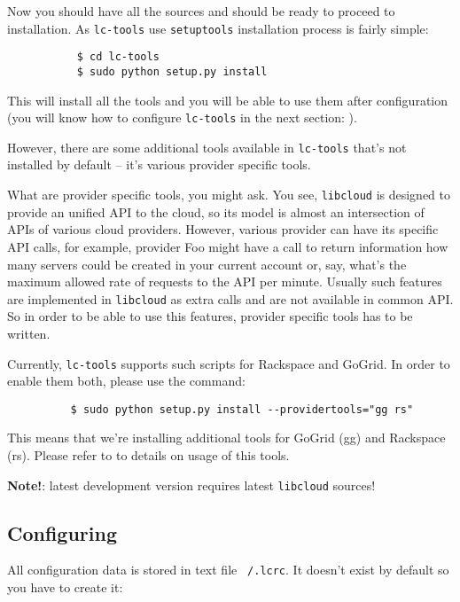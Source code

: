 \documentclass[a4paper]{report}
\begin{document}
          Now you should have all the sources and should be ready to proceed to
          installation. As {\tt lc-tools} use {\tt setuptools} installation
          process is fairly simple:

          \begin{verbatim}
           $ cd lc-tools
           $ sudo python setup.py install
           \end{verbatim}

         This will install all the tools and you will be able to use them
         after configuration (you will know how to configure {\tt lc-tools}
         in the next section: ).

         However, there are some additional tools available in {\tt lc-tools}
         that's not installed by default -- it's various provider specific tools.

         What are provider specific tools, you might ask. You see, {\tt libcloud}
         is designed to provide an unified API to the cloud, so its model is almost
         an intersection of APIs of various cloud providers. However, various
         provider can have its specific API calls, for example, provider Foo might
         have a call to return information how many servers could be created in
         your current account or, say, what's the maximum allowed rate of requests
         to the API per minute. Usually such features are implemented in {\tt libcloud}
         as extra calls and are not available in common API. So in order to be able
         to use this features, provider specific tools has to be written.

         Currently, {\tt lc-tools} supports such scripts for Rackspace and GoGrid.
         In order to enable them both, please use the command:

         \begin{verbatim}
          $ sudo python setup.py install --providertools="gg rs"
          \end{verbatim}

         This means that we're installing additional tools for GoGrid (gg) and
         Rackspace (rs). Please refer to  to details on usage
         of this tools.


         \textbf{Note!}: latest development version requires latest {\tt libcloud}
         sources!
      \subsection{Configuring} \label{conf}
      All configuration data is stored in text file {\tt ~/.lcrc}. It doesn't exist
      by default so you have to create it:
\end{document}
